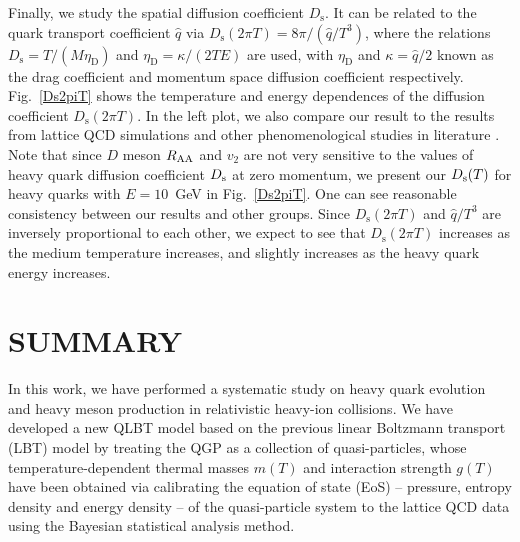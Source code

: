 \documentclass[aps,superscriptaddress,prc,twocolumn,nofootinbib]{revtex4}
\begin{document}
Finally, we study the spatial diffusion coefficient $D_\mathrm{s}$. It can be related to the quark transport coefficient $\hat{q}$ via $D_\mathrm{s}(2\pi T) = 8\pi/(\hat{q}/T^3)$, where the relations $D_\mathrm{s}=T/(M\eta_\mathrm{D})$ and  $\eta_\mathrm{D}=\kappa/(2TE)$ are used, with $\eta_\mathrm{D}$ and $\kappa = \hat{q}/2$ known as the drag coefficient and momentum space diffusion coefficient respectively. Fig.~\ref{Ds2piT} shows the temperature and energy dependences of the diffusion coefficient $D_\mathrm{s}(2 \pi T)$. In the left plot, we also compare our result to the results from lattice QCD simulations \cite{Ding:2012sp, Banerjee:2011ra} and other phenomenological studies in literature \cite{Song:2015ykw,Scardina:2017ipo,Riek:2010fk,Gossiaux:2008jv,Xu:2017obm}.
Note that since $D$ meson $R_{\rm AA}$ and $v_2$ are not very sensitive to the values of heavy quark diffusion coefficient $D_{\rm s}$ at zero momentum, we present our $D_{\rm s}(T)$ for heavy quarks with $E=10$~GeV in Fig.~\ref{Ds2piT}.
One can see reasonable consistency between our results and other groups.
Since $D_\mathrm{s}(2\pi T)$ and $\hat{q}/T^3$ are inversely proportional to each other, we expect to see that $D_\mathrm{s}(2\pi T)$ increases as the medium temperature increases, and slightly increases as the heavy quark energy increases.


\section{SUMMARY}
\label{sec:summary}

In this work, we have performed a systematic study on heavy quark evolution and heavy meson production in relativistic heavy-ion collisions.
We have developed a new QLBT model based on the previous linear Boltzmann transport (LBT) model by treating the QGP as a collection of quasi-particles, whose temperature-dependent thermal masses $m(T)$ and interaction strength $g(T)$ have been obtained via calibrating the equation of state (EoS) -- pressure, entropy density and energy density -- of the quasi-particle system to the lattice QCD data using the Bayesian statistical analysis method.
\end{document}
